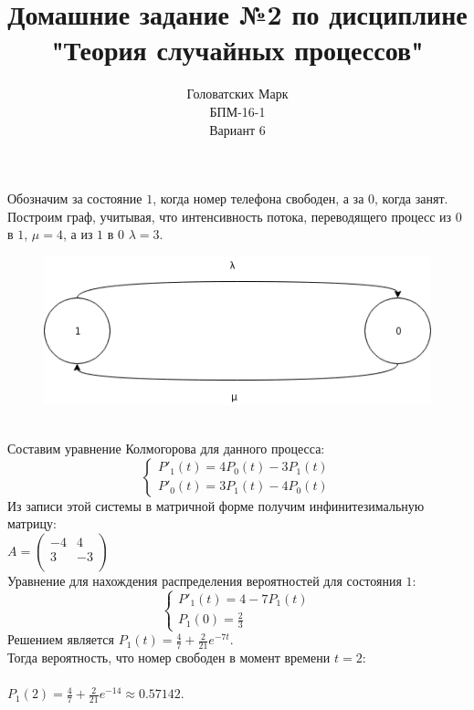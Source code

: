 \documentclass [a4paper,12pt]{article}
\title{Домашние задание №2 по дисциплине "Теория случайных процессов"}
\author{Головатских Марк \\БПМ-16-1 \\ Вариант 6}
\date{}
\begin{document}
\maketitle
{}
\newpage
{}
Обозначим за состояние $1$, когда номер телефона свободен, а за $0$, когда занят.\\
Построим граф, учитывая, что интенсивность потока, переводящего процесс из $0$ в $1$, $\mu = 4$, а из $1$ в $0$ $\lambda = 3$.\\
\begin{figure}[h!]
  \includegraphics[width=\linewidth]{hw2.png}
\end{figure}\\
Составим уравнение Колмогорова для данного процесса:
\begin{equation*}
 \begin{cases}
  P'_1(t) = 4P_0(t) - 3P_1(t)
  \\
  P'_0(t) = 3P_1(t) - 4P_0(t)
 \end{cases}
\end{equation*}
Из записи этой системы в матричной форме получим инфинитезимальную матрицу:\\
$A = \left(
\begin{matrix}
-4 & 4\\
3 & -3\\
\end{matrix}
\right) $\\
Уравнение для нахождения распределения вероятностей для состояния $1$:\\
\begin{equation*}
 \begin{cases}
  P'_1(t) = 4 - 7P_1(t)
  \\
  P_1(0) = \frac{2}{3}
 \end{cases}
\end{equation*}
Решением является $P_1(t)=\frac{4}{7} + \frac{2}{21}e^{-7t}$.\\

Тогда вероятность, что номер свободен в момент времени $t = 2$:\\
\\$P_1(2) = \frac{4}{7} + \frac{2}{21}e^{-14} \approx 0.57142$.
\end{document}
